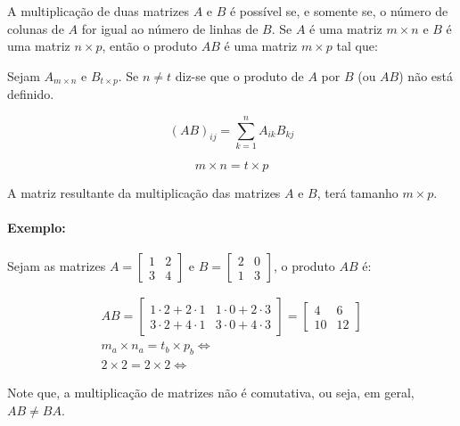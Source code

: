 A multiplicação de duas matrizes $A$ e $B$ é possível se, e somente se, o número de colunas de $A$ for igual ao número de linhas de $B$. Se $A$ é uma matriz $m \times n$ e $B$ é uma matriz $n \times p$, então o produto $AB$ é uma matriz $m \times p$ tal que:

\begin{center}
    Sejam $A_{m \times n}$ e $B_{t \times p}$. Se $n \neq t$ diz-se que o produto de $A$ por $B$ (ou $AB$) não está definido. 
\end{center}

\[ 
    {(AB)}_{ij} = \sum_{k=1}^{n} A_{ik} B_{kj}
\]

\[ 
    \boxed{m} \times \boxed{n = t} \times \boxed{p}
\]

\begin{center}
    A matriz resultante da multiplicação das matrizes $A$ e $B$, terá tamanho $m \times p$.
\end{center}

\paragraph{Exemplo:}

Sejam as matrizes $A = \begin{bmatrix}
    1 & 2 \\ 
    3 & 4
\end{bmatrix}$ e $B = \begin{bmatrix}
    2 & 0 \\ 
    1 & 3
\end{bmatrix}$, o produto $AB$ é:

\begin{gather*}
    AB = \begin{bmatrix}
        1 \cdot 2 + 2 \cdot 1 & 1 \cdot 0 + 2 \cdot 3 \\ 
        3 \cdot 2 + 4 \cdot 1 & 3 \cdot 0 + 4 \cdot 3
    \end{bmatrix} = \begin{bmatrix}
        4 & 6 \\ 
        10 & 12
    \end{bmatrix} \\
    \boxed{m_a} \times \boxed{n_a = t_b} \times \boxed{p_b} \Leftrightarrow \\
    \boxed{2} \times \boxed{2 = 2} \times \boxed{2} \Leftrightarrow
\end{gather*}

\begin{center}
    Note que, a multiplicação de matrizes não é comutativa, ou seja, em geral, $AB \neq BA$.
\end{center}

